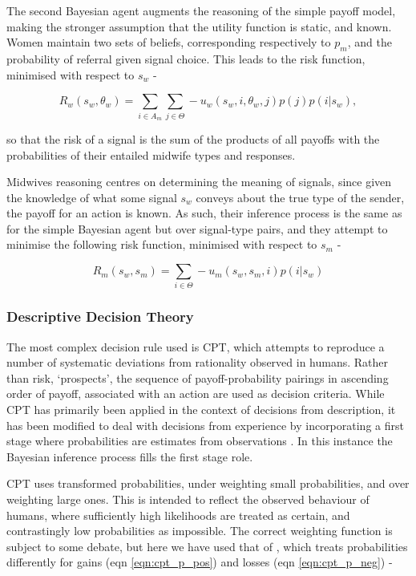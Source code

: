 \documentclass[graybox]{svmult}
\begin{document}
The second Bayesian agent augments the reasoning of the simple payoff model, making the stronger assumption that the utility function is static, and known. Women maintain two sets of beliefs, corresponding respectively to \(p_{m}\), and the probability of referral given signal choice. This leads to the risk function, minimised with respect to \(s_{w}\) -

\begin{equation}
R_{w}(s_{w}, \theta_{w}) = \sum_{i\in A_{m}}\sum_{j\in \Theta} -u_{w}(s_{w}, i, \theta_{w}, j)p(j)p(i | s_{w}),
\end{equation}

so that the risk of a signal is the sum of the products of all payoffs with the probabilities of their entailed midwife types and responses.

Midwives reasoning centres on determining the meaning of signals, since given the knowledge of what some signal \(s_{w}\) conveys about the true type of the sender, the payoff for an action is known. As such, their inference process is the same as for the simple Bayesian agent but over signal-type pairs, and they attempt to minimise the following risk function, minimised with respect to \(s_{m}\) -

\begin{equation}
R_{m}(s_{w}, s_{m}) = \sum_{i\in \Theta} -u_{m}(s_{w}, s_{m}, i)p(i | s_{w})
\end{equation}

\subsubsection{Descriptive Decision Theory}

The most complex decision rule used is \ac{CPT}, which attempts to reproduce a number of systematic deviations from rationality observed in humans. Rather than risk, `prospects', the sequence of payoff-probability pairings in ascending order of payoff, associated with an action  are used as decision criteria. While \ac{CPT} has primarily been applied in the context of decisions from description, it has been modified to deal with decisions from experience by incorporating a first stage where probabilities are estimates from observations \cite{FoxCPT}. In this instance the Bayesian inference process fills the first stage role.

\ac{CPT} uses transformed probabilities, under weighting small probabilities, and over weighting large ones. This is intended to reflect the observed behaviour of humans, where sufficiently high likelihoods are treated as certain, and contrastingly low probabilities as impossible. The correct weighting function is subject to some debate, but here we have used that of \citet{Tversky1992}, which treats probabilities differently for gains (eqn \ref{eqn:cpt_p_pos}) and losses (eqn \ref{eqn:cpt_p_neg}) -
\end{document}
